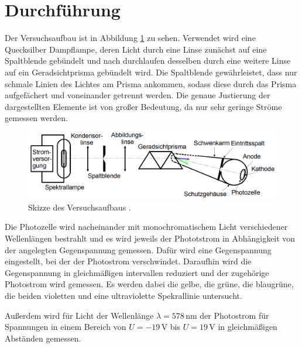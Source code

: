 \section{Durchführung}
\label{sec:Durchführung}

Der Versuchsaufbau ist in Abbildung \ref{fig:aufbau} zu sehen. Verwendet wird eine
Quecksilber Dampflampe, deren Licht durch eine Linse zunächst auf eine Spaltblende
gebündelt und nach durchlaufen desselben durch eine weitere Linse auf ein
Geradsichtprisma gebündelt wird. Die Spaltblende gewährleistet, dass nur schmale Linien
des Lichtes am Prisma ankommen, sodass diese durch das Prisma aufgefächert und voneinander getrennt
werden. Die genaue Justierung der dargestellten Elemente ist von großer Bedeutung,
da nur sehr geringe Ströme gemessen werden.

\begin{figure}
  \centering
  \includegraphics[width=\textwidth]{data/aufbau.png}
  \caption{Skizze des Versuchsaufbaus \cite{Versuchsanleitung}.}
  \label{fig:aufbau}
\end{figure}

Die Photozelle wird nacheinander mit monochromatischem Licht verschiedener Wellenlängen
bestrahlt und es wird jeweils der Phototstrom in Abhängigkeit von der angelegten
Gegenspannung gemessen. Dafür wird eine Gegenspannung eingestellt, bei der der
Photostrom verschwindet. Daraufhin wird die Gegenspannung in gleichmäßigen intervallen
reduziert und der zugehörige Photostrom wird gemessen. Es werden dabei die gelbe,
die grüne, die blaugrüne, die beiden violetten und eine ultraviolette Spekrallinie
untersucht.

Außerdem wird für Licht der Wellenlänge $\lambda=578\,$nm der Photostrom für Spannungen
in einem Bereich von $U=-19\,$V bis $U=19\,$V in gleichmäßigen Abständen gemessen.
